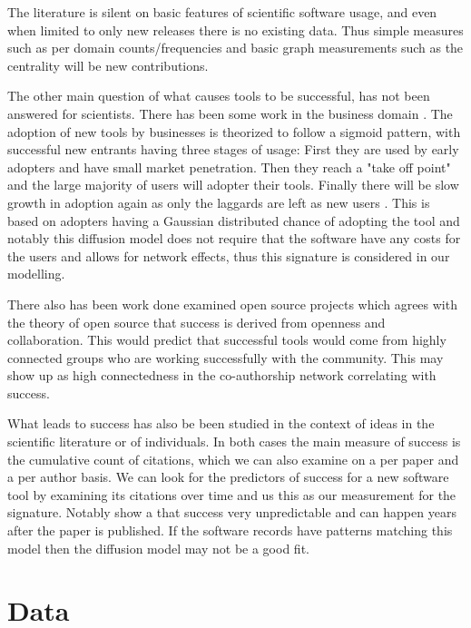 \documentclass[12pt, a4paper]{article}
\begin{document}
The literature is silent on basic features of scientific software usage, and even when limited to only new releases there is no existing data. Thus simple measures such as per domain counts/frequencies and basic graph measurements such as the centrality will be new contributions. 

The other main question of what causes tools to be successful, has not been answered for scientists. There has been some work in the business domain \citep{xin2008software}\citep{hsu2009computer}. The adoption of new tools by businesses is theorized to follow a sigmoid pattern, with successful new entrants having three stages of usage: First they are used by early adopters and have small market penetration. Then they reach a "take off point" and the large majority of users will adopter their tools. Finally there will be slow growth in adoption again as only the laggards are left as new users \citep{xin2008software}. This is based on adopters having a Gaussian distributed chance of adopting the tool and notably this diffusion model does not require that the software have any costs for the users and allows for network effects, thus this signature is considered in our modelling.

There also has been work done examined open source projects \citep{mockus2002two} which agrees with the theory \citep{raymond1999cathedral} of open source that success is derived from openness and collaboration. This would predict that successful tools would come from highly connected groups who are working successfully with the community. This may show up as high connectedness in the co-authorship network correlating with success.

What leads to success has also be been studied in the context of ideas in the scientific literature \citep{acharya2004ideas} \citep{johntalk} or of individuals\citep{sinatra2016quantifying}. In both cases the main measure of success is the cumulative count of citations, which we can also examine on a per paper and a per author basis. We can look for the predictors of success for a new software tool by examining its citations over time and us this as our measurement for the signature. Notably \cite{sinatra2016quantifying} show a that success very unpredictable and can happen years after the paper is published. If the software records have patterns matching this model then the diffusion model may not be a good fit.

\section{Data}
\end{document}
